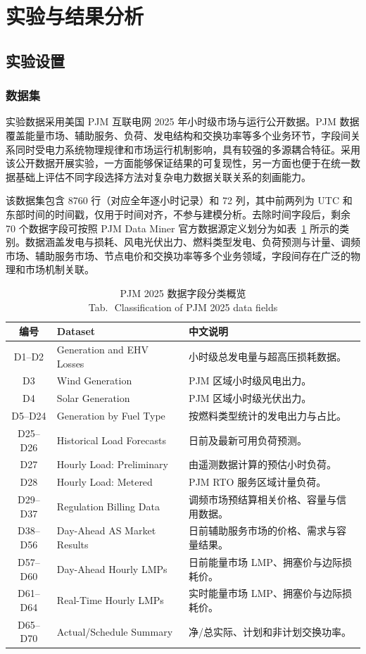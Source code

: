 \documentclass[UTF8,zihao=5,twoside]{ctexart}
\numberwithin{equation}{section}
\newcommand{\tabbicaption}[2]{%
  \caption{#1\\[-0.2em]\small Tab.\,\thetable\ #2}
}
\begin{document}
\section{实验与结果分析}
\subsection{实验设置}
\subsubsection{数据集}
实验数据采用美国 PJM 互联电网 2025 年小时级市场与运行公开数据\cite{ref-pjm-dataminer}。PJM 数据覆盖能量市场、辅助服务、负荷、发电结构和交换功率等多个业务环节，字段间关系同时受电力系统物理规律和市场运行机制影响，具有较强的多源耦合特征。采用该公开数据开展实验，一方面能够保证结果的可复现性，另一方面也便于在统一数据基础上评估不同字段选择方法对复杂电力数据关联关系的刻画能力。

该数据集包含 8760 行（对应全年逐小时记录）和 72 列，其中前两列为 UTC 和东部时间的时间戳，仅用于时间对齐，不参与建模分析。去除时间字段后，剩余 70 个数据字段可按照 PJM Data Miner 官方数据源定义划分为如表~\ref{tab:data_overview} 所示的类别。数据涵盖发电与损耗、风电光伏出力、燃料类型发电、负荷预测与计量、调频市场、辅助服务市场、节点电价和交换功率等多个业务领域，字段间存在广泛的物理和市场机制关联。

\begin{table}[!tbp]
\centering
\scriptsize
\setlength{\tabcolsep}{2pt}
\tabbicaption{PJM 2025 数据字段分类概览}{Classification of PJM 2025 data fields}
\label{tab:data_overview}
\begin{tabularx}{\columnwidth}{c>{\raggedright\arraybackslash}p{}X}
\toprule
编号 & Dataset & 中文说明 \\
\midrule
D1--D2 & Generation and EHV Losses & 小时级总发电量与超高压损耗数据。 \\
D3 & Wind Generation & PJM 区域小时级风电出力。 \\
D4 & Solar Generation & PJM 区域小时级光伏出力。 \\
D5--D24 & Generation by Fuel Type & 按燃料类型统计的发电出力与占比。 \\
D25--D26 & Historical Load Forecasts & 日前及最新可用负荷预测。 \\
D27 & Hourly Load: Preliminary & 由遥测数据计算的预估小时负荷。 \\
D28 & Hourly Load: Metered & PJM RTO 服务区域计量负荷。 \\
D29--D37 & Regulation Billing Data & 调频市场预结算相关价格、容量与信用数据。 \\
D38--D56 & Day-Ahead AS Market Results & 日前辅助服务市场的价格、需求与容量结果。 \\
D57--D60 & Day-Ahead Hourly LMPs & 日前能量市场 LMP、拥塞价与边际损耗价。 \\
D61--D64 & Real-Time Hourly LMPs & 实时能量市场 LMP、拥塞价与边际损耗价。 \\
D65--D70 & Actual/Schedule Summary & 净/总实际、计划和非计划交换功率。 \\
\bottomrule
\end{tabularx}
\end{table}
\end{document}
